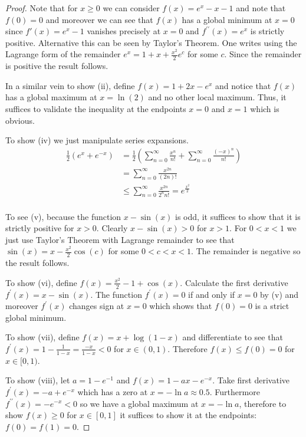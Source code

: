 \documentclass{amsbook}
\theoremstyle{definition}
\theoremstyle{remark}
\begin{document}
\begin{proof}
Note that for ${x\geq0}$ we can consider $f(x) = e^x - x -1$ and note
that $f(0)=0$ and moreover we can see that $f(x)$ has a global minimum
at $x=0$ since $f'(x) = e^x - 1$ vanishes precisely at $x=0$ and
$f^{\prime \prime}(x)=e^x$ is strictly positive.  Alternative this can
be seen by Taylor's Theorem.  One writes using the Lagrange form of
the remainder $e^x = 1 + x + \frac{x^2}{2} e^c$ for some $c$.
Since the remainder is positive the result follows.

In a similar vein to show (ii), define $f(x) = 1+2x-e^x$ and notice that $f(x)$ has
a global maximum at $x=\ln(2)$ and no other local maximum.  Thus, it
suffices to validate the inequality at the endpoints $x=0$ and $x=1$
which is obvious.

To show (iv) we just manipulate series expansions.
\begin{align*}
\frac{1}{2}\left(e^x + e^{-x}\right) & = \frac{1}{2}\left(\sum_{n=0}^\infty
\frac{x^n}{n!} + \sum_{n=0}^\infty \frac{(-x)^n}{n!}\right) \\
& = \sum_{n=0}^\infty \frac{x^{2n}}{(2n)!} \\
& \leq \sum_{n=0}^\infty \frac{x^{2n}}{2^n n!} = e^{\frac{x^2}{2}}\\
\end{align*}

To see (v),  because the function $x - \sin(x)$ is odd, it suffices to
show that it is strictly positive for $x > 0$.
Clearly $x - \sin(x) > 0$ for $x > 1$.   For $0 < x < 1$ we just use
Taylor's Theorem with Lagrange remainder to see that $\sin(x) = x -
\frac{x^2}{2} \cos(c)$ for some $0 < c < x < 1$.  The remainder is
negative so the result follows.

To show (vi), define $f(x) = \frac{x^2}{2} -1 +  \cos(x)$.  Calculate
the first derivative $f^\prime(x) = x - \sin(x)$.  The function
$f^\prime(x) = 0$ if and only if $x=0$ by (v) and moreover $f^\prime(x)$ changes sign at $x=0$
which shows that $f(0) = 0$ is a strict global minimum.

To show (vii), define $f(x) = x + \log(1 -x)$ and differentiate to see
that $f^\prime(x) = 1 - \frac{1}{1-x} = \frac{-x}{1-x} < 0$ for $x \in
(0,1)$.  Therefore $f(x) \leq f(0)=0$ for $x \in [0,1)$.

To show (viii), let $a = 1 - e^{-1}$ and $f(x) = 1 - ax - e^{-x}$.
Take first derivative $f^\prime(x) = -a + e^{-x}$ which has a zero at
$x = -\ln a \approx 0.5$.  Furthermore $f^{\prime \prime}(x) = -e^{-x}
< 0$ so we have a global maximum at $x = -\ln a$, therefore to show
$f(x) \geq 0$  for $x \in [0,1]$ it suffices to show it at the
endpoints: $f(0) = f(1) = 0$.
\end{proof}
\end{document}
